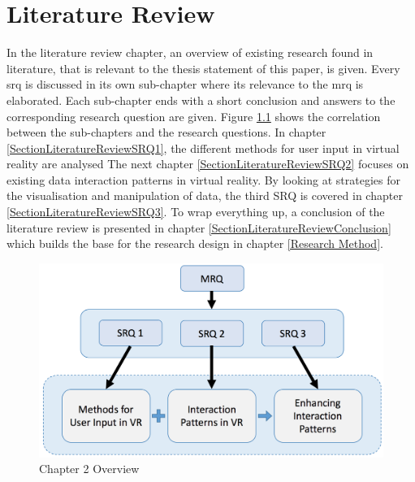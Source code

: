 
\chapter{Literature Review} %

\label{ChapterLiteratureReview} %

In the literature review chapter, an overview of existing research found in literature, that is relevant to the thesis statement of this paper, is given. Every \gls{srq} is discussed in its own sub-chapter where its relevance to the \gls{mrq} is elaborated. Each sub-chapter ends with a short conclusion and answers to the corresponding research question are given.
Figure \ref{fig:litreviewoverview} shows the correlation between the sub-chapters and the research questions. In chapter \ref{SectionLiteratureReviewSRQ1}, the different methods for user input in virtual reality are analysed The next chapter \ref{SectionLiteratureReviewSRQ2} focuses on existing data interaction patterns in virtual reality. By looking at strategies for the visualisation and manipulation of data, the third SRQ is covered in chapter \ref{SectionLiteratureReviewSRQ3}. To wrap everything up, a conclusion of the literature review is presented in chapter \ref{SectionLiteratureReviewConclusion} which builds the base for the research design in chapter \ref{Research Method}.
\newline
\begin{figure}[h]
	\begin{center}
		\includegraphics[width=12cm]{03_Figures/05_LitReview/LitReview_SRQ.png}
		\caption{Chapter 2 Overview}
		\label{fig:litreviewoverview}
	\end{center}
\end{figure}


